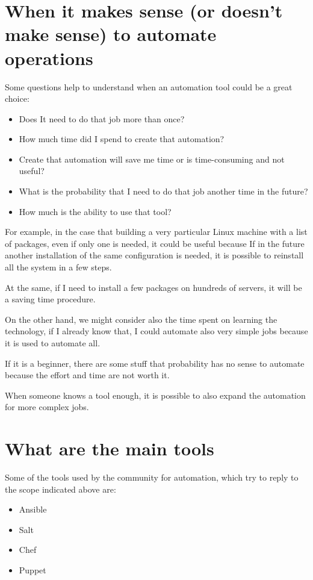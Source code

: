 \documentclass[12pt,a4paper,openright,twoside]{book}
\begin{document}
\section{When it makes sense (or doesn't make sense) to automate operations}
Some questions help to understand when an automation tool could be a great choice:
\begin{itemize}
    \item Does It need to do that job more than once?
    \item How much time did I spend to create that automation?
    \item Create that automation will save me time or is time-consuming and not useful?
    \item What is the probability that I need to do that job another time in the future?
    \item How much is the ability to use that tool?
\end{itemize}

For example, in the case that building a very particular Linux machine with a list of packages, even if only one is needed, it could be useful because If in the future another installation of the same configuration is needed, it is possible to reinstall all the system in a few steps.


At the same, if I need to install a few packages on hundreds of servers, it will be a saving time procedure.


On the other hand, we might consider also the time spent on learning the technology, if I already know that, I could automate also very simple jobs because it is used to automate all.


If it is a beginner, there are some stuff that probability has no sense to automate because the effort and time are not worth it.


When someone knows a tool enough, it is possible to also expand the automation for more complex jobs.

\section{What are the main tools}
Some of the tools used by the community for automation, which try to reply to the scope indicated above are:

\begin{itemize}
    \item Ansible
    \item Salt
    \item Chef
    \item Puppet
\end{itemize}
\end{document}
